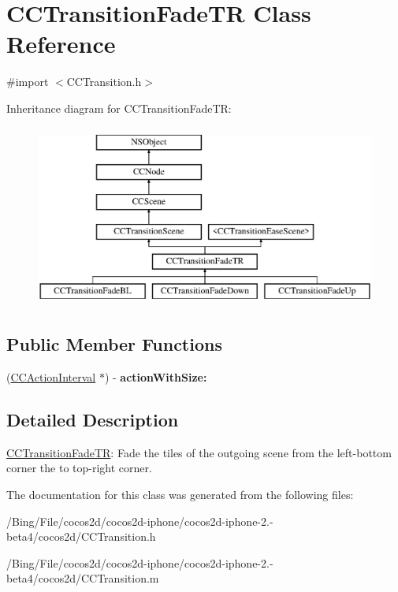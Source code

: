 \hypertarget{interface_c_c_transition_fade_t_r}{\section{C\-C\-Transition\-Fade\-T\-R Class Reference}
\label{interface_c_c_transition_fade_t_r}
}


{\ttfamily \#import $<$C\-C\-Transition.\-h$>$}

Inheritance diagram for C\-C\-Transition\-Fade\-T\-R\-:\begin{figure}[H]
\begin{center}
\leavevmode
\includegraphics[height=6.000000cm]{interface_c_c_transition_fade_t_r}
\end{center}
\end{figure}
\subsection*{Public Member Functions}
\begin{DoxyCompactItemize}
\item 
\hypertarget{interface_c_c_transition_fade_t_r_a1104876a84d19b2a7bbdf3e0d8efd2d2}{(\hyperlink{class_c_c_action_interval}{C\-C\-Action\-Interval} $\ast$) -\/ {\bfseries action\-With\-Size\-:}}\label{interface_c_c_transition_fade_t_r_a1104876a84d19b2a7bbdf3e0d8efd2d2}

\end{DoxyCompactItemize}


\subsection{Detailed Description}
\hyperlink{interface_c_c_transition_fade_t_r}{C\-C\-Transition\-Fade\-T\-R}\-: Fade the tiles of the outgoing scene from the left-\/bottom corner the to top-\/right corner. 

The documentation for this class was generated from the following files\-:\begin{DoxyCompactItemize}
\item 
/\-Bing/\-File/cocos2d/cocos2d-\/iphone/cocos2d-\/iphone-\/2.-\/beta4/cocos2d/C\-C\-Transition.\-h\item 
/\-Bing/\-File/cocos2d/cocos2d-\/iphone/cocos2d-\/iphone-\/2.-\/beta4/cocos2d/C\-C\-Transition.\-m\end{DoxyCompactItemize}
